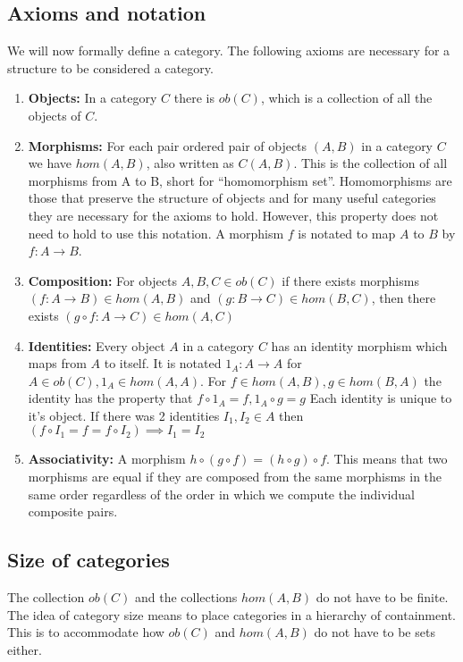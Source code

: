 \documentclass[10pt,a4paper,reqno]{amsart}
\numberwithin{figure}{section}
\begin{document}
\subsection{Axioms and notation}
We will now formally define a category. The following axioms are necessary for a
structure to be considered a category.
\begin{enumerate}
        \item \textbf{Objects:} In a category $C$ there is $ob(C)$, which is a
        collection of all the objects of $C$.

        \item \textbf{Morphisms:} For each pair ordered pair of objects $(A,B)$
        in a category $C$ we have $hom(A,B)$, also written as $C(A,B)$.  This is
        the collection of all morphisms from A to B, short for ``homomorphism
        set''.  Homomorphisms are those that preserve the structure of objects
        and for many useful categories they are necessary for the axioms to
        hold.  However, this property does not need to hold to use this
        notation.  A morphism $f$ is notated to map $A$ to $B$ by $f: A\to B$.

        \item \textbf{Composition:} For objects $A,B,C\in ob(C)$ if there exists
        morphisms $(f: A\to B)\in hom(A,B)$ and $(g: B\to C)\in hom(B,C)$, then
        there exists $(g\circ f: A\to C)\in hom(A,C)$

        \item \textbf{Identities:} Every object $A$ in a category $C$ has an
        identity morphism which maps from $A$ to itself.  It is notated $1_A:
        A\to A$ for $A\in ob(C), 1_A\in hom(A,A)$.  For $f\in hom(A,B), g\in
        hom(B,A)$ the identity has the property that $f\circ 1_A = f, 1_A\circ g
        = g$ Each identity is unique to it's object. If there was 2 identities
        $I_1,I_2\in A$ then $(f\circ I_1 = f = f\circ I_2) \implies I_1=I_2$

        \item \textbf{Associativity:} A morphism $h\circ(g\circ f) = (h\circ
        g)\circ f$.  This means that two morphisms are equal if they are
        composed from the same morphisms in the same order regardless of the
        order in which we compute the individual composite pairs.
\end{enumerate}

\subsection{Size of categories}
The collection $ob(C)$ and the collections $hom(A,B)$ do not have to be finite.
The idea of category size means to place categories in a hierarchy of
containment. This is to accommodate how $ob(C)$ and $hom(A,B)$ do not have to be
sets either.
\end{document}
